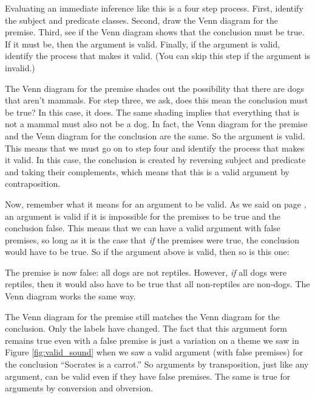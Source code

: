\begin{kormanize}
\end{kormanize}

Evaluating an immediate inference like this is a four step process. First, identify the subject and predicate classes. Second, draw the Venn diagram for the premise. Third, see if the Venn diagram shows that the conclusion must be true. If it must be, then the argument is valid. Finally, if the argument is valid, identify the process that makes it valid. (You can skip this step if the argument is invalid.)

The Venn diagram for the premise shades out the possibility that there are dogs that aren't mammals. For step three, we ask, does this mean the conclusion must be true?  In this case, it does. The same shading implies that everything that is not a mammal must also not be a dog. In fact, the Venn diagram for the premise and the Venn diagram for the conclusion are the same. So the argument is valid. This means that we must go on to step four and identify the process that makes it valid. In this case, the conclusion is created by reversing subject and predicate and taking their complements, which means that this is a valid argument by contraposition.

Now, remember what it means for an argument to be valid. \label{valid_definition_reinforcement} As we said on page \pageref{def:valid}, an argument is valid if it is impossible for the premises to be true and the conclusion false. This means that we can have a valid argument with false premises, so long as it is the case that \emph{if} the premises were true, the conclusion would have to be true. So if the argument above is valid, then so is this one:

\begin{kormanize}
\end{kormanize}

The premise is now false: all dogs are not reptiles. However, \emph{if} all dogs were reptiles, then it would also have to be true that all non-reptiles are non-dogs. The Venn diagram works the same way.



The Venn diagram for the premise still matches the Venn diagram for the conclusion. Only the labels have changed. The fact that this argument form remains true even with a false premise is just a variation on a theme we saw in
Figure \ref{fig:valid_sound} when we saw a valid argument (with false premises) for the conclusion ``Socrates is a carrot.'' So arguments by transposition, just like any argument, can be valid even if they have false premises. The same is true for arguments by conversion and obversion.

